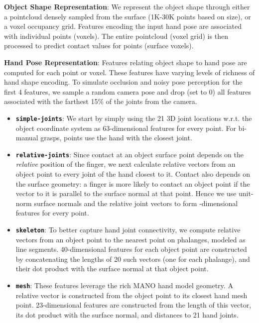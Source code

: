 \documentclass[runningheads]{llncs}
\begin{document}
\noindent\textbf{Object Shape Representation}: We represent the object shape through either a pointcloud densely sampled from the surface (1K-30K points based on size), or a  voxel occupancy grid. Features encoding the input hand pose are associated with individual points (voxels). The entire pointcloud (voxel grid) is then processed to predict contact values for points (surface voxels).

\noindent\textbf{Hand Pose Representation}: Features relating object shape to hand pose are computed for each point or voxel. These features have varying levels of richness of hand shape encoding. To simulate occlusion and noisy pose perception for the first 4 features, we sample a random camera pose and drop (set to 0) all features associated with the farthest 15\% of the joints from the camera.
\begin{itemize}
 \item \texttt{\textbf{simple-joints}}: We start by simply using the 21 3D joint locations w.r.t. the object coordinate system as 63-dimensional features for every point. For bi-manual grasps, points use the hand with the closest joint.
 \item \texttt{\textbf{relative-joints}}: Since contact at an object surface point depends on the \textit{relative} position of the finger, we next calculate relative vectors from an object point to every joint of the hand closest to it. Contact also depends on the surface geometry: a finger is more likely to contact an object point if the vector to it is parallel to the surface normal at that point. Hence we use unit-norm surface normals and the relative joint vectors to form -dimensional features for every point.
 \item \texttt{\textbf{skeleton}}: To better capture hand joint connectivity, we compute relative vectors from an object point to the nearest point on phalanges, modeled as line segments. 40-dimensional features for each object point are constructed by concatenating the lengths of 20 such vectors (one for each phalange), and their dot product with the surface normal at that object point.
 \item \texttt{\textbf{mesh}}: These features leverage the rich MANO hand model geometry. A relative vector is constructed from the object point to its closest hand mesh point. 23-dimensional features are constructed from the length of this vector, its dot product with the surface normal, and distances to 21 hand joints.

\end{itemize}
\end{document}

